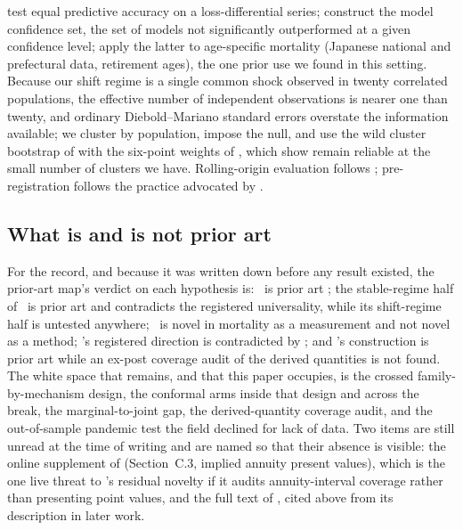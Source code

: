 \citet{diebold1995comparing} test equal predictive accuracy on a
loss-differential series; \citet{hansen2011model} construct the model
confidence set, the set of models not significantly outperformed at a given
confidence level; \citet{shang2018model} apply the latter to age-specific
mortality (Japanese national and prefectural data, retirement ages), the one
prior use we found in this setting. Because our shift regime is a single
common shock observed in twenty correlated populations, the effective
number of independent observations is nearer one than twenty, and ordinary
Diebold--Mariano standard errors overstate the information available; we
cluster by population, impose the null, and use the wild cluster bootstrap
of \citet{cameron2008bootstrap} with the six-point weights of
\citet{webb2023reworking}, which \citet{mackinnon2017wild} show remain
reliable at the small number of clusters we have. Rolling-origin evaluation
follows \citet{tashman2000out}; pre-registration follows the practice
advocated by \citet{nosek2018preregistration}.

\subsection{What is and is not prior art}

For the record, and because it was written down before any result existed,
the prior-art map's verdict on each hypothesis is: \Hone\ is prior art
\citep{barigou2023bayesian,goes2025bayesian,schnurch2022point}; the
stable-regime half of \Htwo\ is prior art and contradicts the registered
universality, while its shift-regime half is untested anywhere; \Hthree\ is
novel in mortality as a measurement and not novel as a method; \Hfour's
registered direction is contradicted by \citet{dowd2010backtesting}; and
\Hfive's construction is prior art while an ex-post coverage audit of the
derived quantities is not found. The white space that remains, and that
this paper occupies, is the crossed family-by-mechanism design, the
conformal arms inside that design and across the break, the
marginal-to-joint gap, the derived-quantity coverage
audit, and the out-of-sample pandemic test the field declined for lack of
data. Two items are still unread at the time of writing and are named so
that their absence is visible: the online supplement of
\citet{schnurch2022point} (Section~C.3, implied annuity present values),
which is the one live threat to \Hfive's residual novelty if it audits
annuity-interval coverage rather than presenting point values, and the full
text of \citet{stankeviciute2021conformal}, cited above from its
description in later work.

